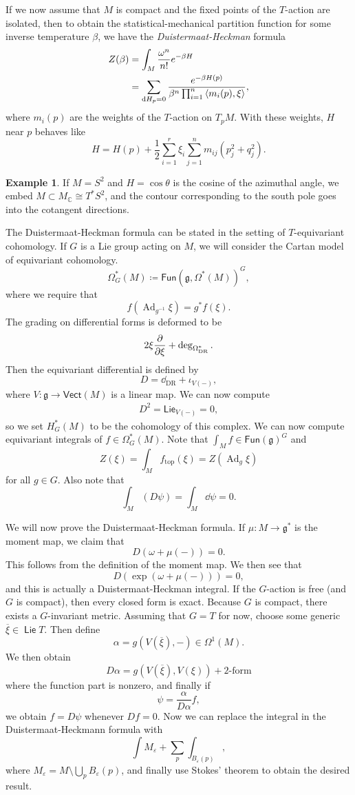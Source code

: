 \documentclass[leqno, openany]{memoir}
\theoremstyle{definition}
\newtheorem{exm}[thm]{Example}
\theoremstyle{remark}
\theoremstyle{plain}
\theoremstyle{definition}
\theoremstyle{remark}
\newcommand{\C}{\mathbb{C}}
\newcommand{\g}{\mathfrak{g}}
\newcommand{\ep}{\varepsilon}
\newcommand{\mr}[1]{\mathrm{#1}}
\newcommand{\ms}[1]{\mathsf{#1}}
\newcommand{\on}[1]{\operatorname{#1}}
\newcommand{\ol}[1]{\overline{#1}}
\DeclareMathOperator{\Ad}{Ad}
\begin{document}
If we now assume that $M$ is compact and the fixed points of the $T$-action are isolated, then to obtain the statistical-mechanical partition function for some inverse temperature $\beta$, we have the \textit{Duistermaat-Heckman} formula
\begin{align*}
  Z(\beta) &= \int_M \frac{\omega^n}{n!} e^{-\beta H} \\
  &= \sum_{\dd H_p = 0} \frac{e^{-\beta H(p)}}{\beta^n \prod_{i=1}^n \ev{m_i(p), \xi}},
\end{align*}
where $m_i(p)$ are the weights of the $T$-action on $T_p M$. With these weights, $H$ near $p$ behaves like
\[ H = H(p) + \frac{1}{2} \sum_{i=1}^r \xi_i \sum_{j=1}^n m_{ij}(p_j^2 + q_j^2). \]

\begin{exm}
If $M = S^2$ and $H = \cos\theta$ is the cosine of the azimuthal angle, we embed $M \subset M_{\C} \cong T^* S^2$, and the contour corresponding to the south pole goes into the cotangent directions.
\end{exm}

The Duistermaat-Heckman formula can be stated in the setting of $T$-equivariant cohomology. If $G$ is a Lie group acting on $M$, we will consider the Cartan model of equivariant cohomology.
\[ \Omega_G^*(M) \coloneqq \ms{Fun}(\g, \Omega^*(M))^G, \]
where we require that
\[ f(\Ad_{g^{-1}} \xi) = g^* f(\xi). \]
The grading on differential forms is deformed to be
\[ 2 \xi \pdv{\xi} + \deg_{\Omega^*_{\mr{DR}}}. \]
Then the equivariant differential is defined by
\[ D = \dd_{\mr{DR}} + \iota_{V(-)}, \]
where $V \colon \g \to \ms{Vect}(M)$ is a linear map. We can now compute
\begin{align*}
D^2 = \ms{Lie}_{V(-)} = 0,
\end{align*}
so we set $H_G^*(M)$ to be the cohomology of this complex. We can now compute equivariant integrals of $f \in \Omega_G^*(M)$. Note that $\int_M f \in \ms{Fun}(\g)^G$ and
\[ Z(\xi) = \int_M f_{\mr{top}}(\xi) = Z(\Ad_g \xi) \]
for all $g \in G$. Also note that
\[ \int_M (D \psi) = \int_M \dd \psi = 0. \]

We will now prove the Duistermaat-Heckman formula. If $\mu \colon M \to \g^*$ is the moment map, we claim that
\[ D(\omega + \mu(-)) = 0. \]
This follows from the definition of the moment map. We then see that
\[ D(\exp(\omega + \mu(-))) = 0, \]
and this is actually a Duistermaat-Heckman integral. If the $G$-action is free (and $G$ is compact), then every closed form is exact. Because $G$ is compact, there exists a $G$-invariant metric. Assuming that $G=T$ for now, choose some generic $\ol{\xi} \in \on{\ms{Lie}} T$. Then define
\[ \alpha = g(V(\ol{\xi}), -) \in \Omega^1(M). \]
We then obtain
\[ D \alpha = g(V(\ol{\xi}), V(\xi)) + \text{$2$-form} \]
where the function part is nonzero, and finally if
\[ \psi = \frac{\alpha}{D \alpha} f, \]
we obtain $f = D\psi$ whenever $Df = 0$. Now we can replace the integral in the Duistermaat-Heckmann formula with
\[ \int M_{\ep} + \sum_p \int_{B_{\ep}(p)}, \]
where $M_{\ep} = M \setminus \bigcup_p B_{\ep}(p)$, and finally use Stokes' theorem to obtain the desired result.
\end{document}
